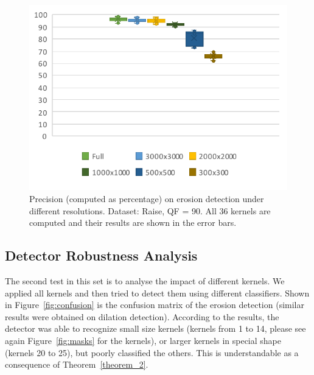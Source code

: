 \documentclass{ieeeaccess}
\begin{document}
\begin{figure}[t!]
	\centering
	\includegraphics[width=\linewidth]{resolutions.pdf}
	\caption{Precision (computed as percentage) on erosion detection under different resolutions. Dataset: Raise, QF = 90. All 36 kernels are computed and their results are shown in the error bars.}
	\label{fig:resolutions}
\end{figure}

\subsection{Detector Robustness Analysis}
\label{subsec:result_attacks}

The second test in this set is to analyse the impact of different kernels. We applied all kernels and then tried to detect them using different classifiers. Shown in Figure~\ref{fig:confusion} is the confusion matrix of the erosion detection (similar results were obtained on dilation detection). According to the results, the detector was able to recognize small size kernels (kernels from 1 to 14, please see again Figure~\ref{fig:masks} for the kernels), or larger kernels in special shape (kernels 20 to 25), but poorly classified the others. This is understandable as a consequence of Theorem~\ref{theorem_2}.
\end{document}
